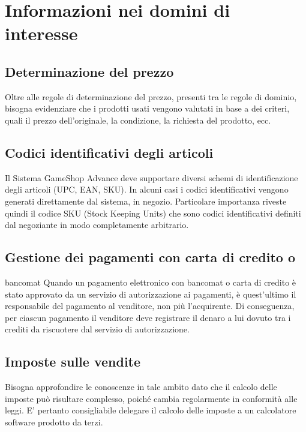 \documentclass[a4paper,10pt]{report}
\begin{document}
\section*{Informazioni nei domini di interesse}

\subsection*{Determinazione del prezzo}
Oltre alle regole di determinazione del prezzo, presenti tra le regole di dominio, bisogna evidenziare che i prodotti usati vengono valutati in base a dei criteri, quali il prezzo dell'originale, la condizione, la richiesta del prodotto, ecc. 

\subsection*{Codici identificativi degli articoli}
Il Sistema GameShop Advance deve supportare diversi schemi di identificazione degli articoli (UPC, EAN, SKU). In alcuni casi i codici identificativi vengono generati direttamente dal sistema, in negozio. Particolare importanza riveste quindi il codice SKU (Stock Keeping Units) che sono codici identificativi definiti dal negoziante in modo completamente arbitrario.

\subsection*{Gestione dei pagamenti con carta di credito o} bancomat
Quando un pagamento elettronico con bancomat o carta di credito è stato approvato da un servizio di autorizzazione ai pagamenti, è quest’ultimo il responsabile del pagamento al venditore, non più l’acquirente. Di conseguenza, per ciascun pagamento il venditore deve registrare il denaro a lui dovuto tra i crediti da riscuotere dal servizio di autorizzazione.

\subsection*{Imposte sulle vendite}
Bisogna approfondire le conoscenze in tale ambito dato che il calcolo delle imposte può risultare complesso, poiché cambia regolarmente in conformità alle leggi. E’ pertanto consigliabile delegare il calcolo delle imposte a un calcolatore software prodotto da terzi.
\end{document}
